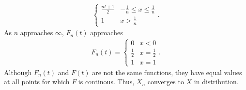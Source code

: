 \documentclass[a4paper]{article}
\begin{document}
\begin{Solution}
\begin{itemize}
\begin{align*}
\begin{cases}
					\frac{nt + 1}{2} & -\frac{1}{n} \le x \le \frac{1}{n} \\ 
					1 & x > \frac{1}{n}
				\end{cases}.
			\end{align*}
			As $n$ approaches $\infty$, $F_n(t)$ approaches
			\begin{align*}
				F_n(t) = \begin{cases}
					0 & x < 0 \\
					\frac{1}{2} & x = \frac{1}{2} \\
					1 & x = 1
				\end{cases}.
			\end{align*}
			Although $F_n(t)$ and $F(t)$ are not the same functions, they have equal values at all points for which $F$ is continous. Thus, $X_n$ converges to $X$ in distribution. 
	\end{itemize}
\end{Solution}
\end{document}
